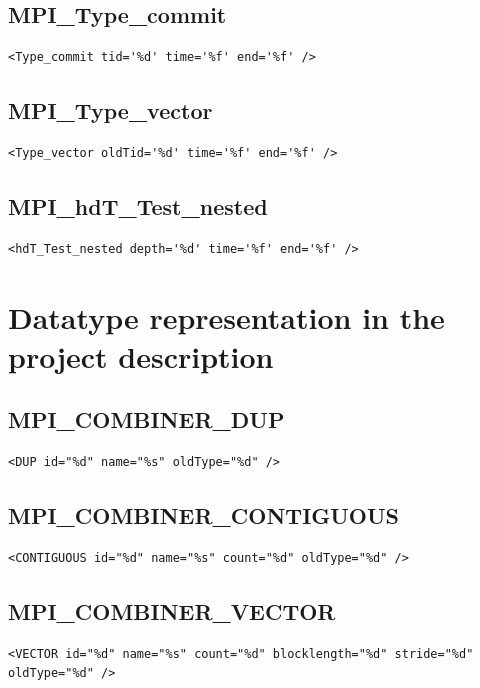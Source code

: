 \documentclass[a4paper,12pt,pdftex]{scrartcl}
\begin{document}
\subsection{MPI\_Type\_commit}
\begin{lstlisting}
<Type_commit tid='%d' time='%f' end='%f' />
\end{lstlisting}

\subsection{MPI\_Type\_vector}
\begin{lstlisting}
<Type_vector oldTid='%d' time='%f' end='%f' />
\end{lstlisting}

\subsection{MPI\_hdT\_Test\_nested}
\begin{lstlisting}
<hdT_Test_nested depth='%d' time='%f' end='%f' />
\end{lstlisting}

\section{Datatype representation in the project description}

\subsection{MPI\_COMBINER\_DUP}
\begin{lstlisting}
<DUP id="%d" name="%s" oldType="%d" />
\end{lstlisting}

\subsection{MPI\_COMBINER\_CONTIGUOUS}
\begin{lstlisting}
<CONTIGUOUS id="%d" name="%s" count="%d" oldType="%d" />
\end{lstlisting}

\subsection{MPI\_COMBINER\_VECTOR}

\begin{lstlisting}
<VECTOR id="%d" name="%s" count="%d" blocklength="%d" stride="%d" oldType="%d" />
\end{lstlisting}
\end{document}
